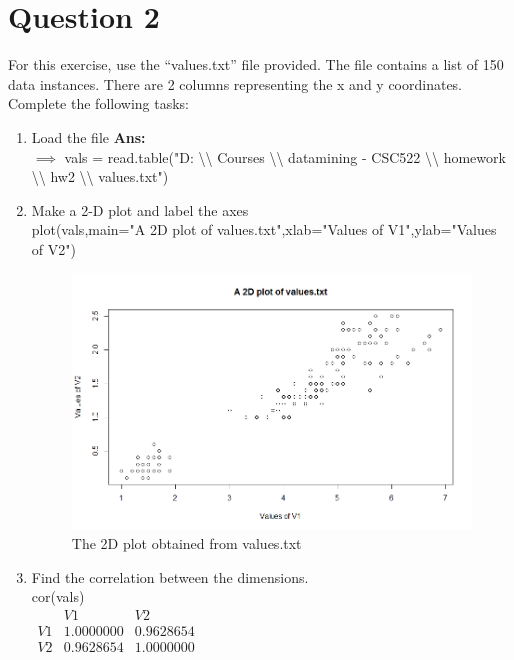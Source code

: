 \documentclass[fontsize=10pt]{scrartcl}
\begin{document}
	\section{Question 2}
	For this exercise, use the “values.txt” file provided. The file contains a list of 150 data instances. There are 2 columns representing the x and y coordinates. Complete the following tasks: \\
	\begin{enumerate}
		\item
		Load the file
		\textbf{Ans:} \\
		$\implies$
		vals = read.table("D:
		\textbackslash\textbackslash
		Courses
		\textbackslash\textbackslash
		datamining - CSC522
		\textbackslash\textbackslash
		homework
		\textbackslash\textbackslash
		hw2
		\textbackslash\textbackslash
		values.txt")

		\item
		Make a 2-D plot and label the axes \\
		plot(vals,main="A 2D plot of values.txt",xlab="Values of V1",ylab="Values of V2") \\
		\begin{figure}[H]
			\begin{center}
				\includegraphics[scale=.5]{resources/q2_plot.png}
				\caption{The 2D plot obtained from values.txt}
			\end{center}
		\end{figure}

		\item
		Find the correlation between the dimensions. \\
		cor(vals) \\
		$\begin{array}{ccc}
			~		&		V1			&	V2			\\
			V1 		&		1.0000000	&	0.9628654	\\
			V2		&		0.9628654	&	1.0000000	\\
		\end{array}$


\end{enumerate}
\end{document}
